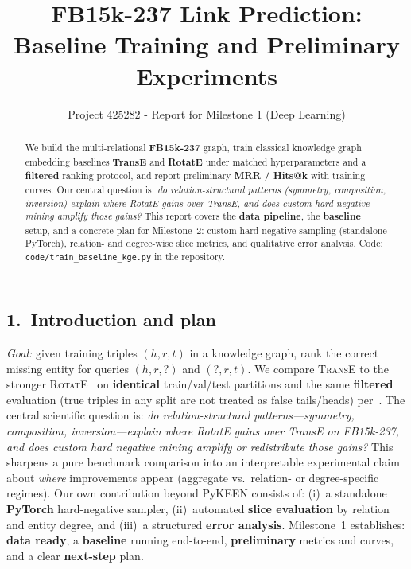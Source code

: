 \documentclass[10pt,a4paper]{article}
\title{FB15k-237 Link Prediction: Baseline Training and Preliminary Experiments}
\author{\kteam}
\date{Project 425282 - Report for Milestone 1 (Deep Learning)}
\begin{document}
\maketitle
\thispagestyle{empty}
\vspace{-0.6em}
\begin{abstract}
We build the multi-relational \textbf{FB15k-237} graph, train classical knowledge graph embedding baselines \textbf{TransE} and \textbf{RotatE} under matched hyperparameters and a \textbf{filtered} ranking protocol, and report preliminary \textbf{MRR / Hits@k} with training curves. Our central question is: \emph{do relation-structural patterns (symmetry, composition, inversion) explain where RotatE gains over TransE, and does custom hard negative mining amplify those gains?} This report covers the \textbf{data pipeline}, the \textbf{baseline} setup, and a concrete plan for Milestone~2: custom hard-negative sampling (standalone PyTorch), relation- and degree-wise slice metrics, and qualitative error analysis. Code: \texttt{code/train\_baseline\_kge.py} in the repository.
\end{abstract}

\subsection*{1.\ Introduction and plan}
\emph{Goal:} given training triples $(h,r,t)$ in a knowledge graph, rank the correct missing entity for queries $(h,r,?)$ and $(?,r,t)$. We compare \textsc{TransE} to the stronger \textsc{RotatE}~\citep{sun2019rotate} on \textbf{identical} train/val/test partitions and the same \textbf{filtered} evaluation (true triples in any split are not treated as false tails/heads) per~\citet{bordes2013translating}. The central scientific question is: \emph{do relation-structural patterns---symmetry, composition, inversion---explain where RotatE gains over TransE on FB15k-237, and does custom hard negative mining amplify or redistribute those gains?} This sharpens a pure benchmark comparison into an interpretable experimental claim about \emph{where} improvements appear (aggregate vs.\ relation- or degree-specific regimes). Our own contribution beyond PyKEEN consists of: (i)~a standalone \textbf{PyTorch} hard-negative sampler, (ii)~automated \textbf{slice evaluation} by relation and entity degree, and (iii)~a structured \textbf{error analysis}. Milestone~1 establishes: \textbf{data ready}, a \textbf{baseline} running end-to-end, \textbf{preliminary} metrics and curves, and a clear \textbf{next-step} plan.
\end{document}
